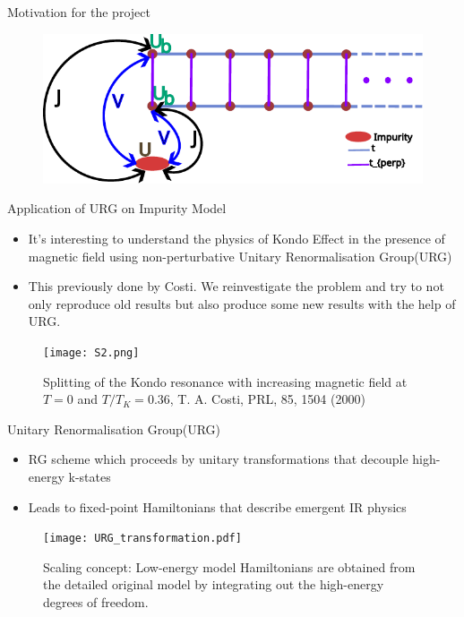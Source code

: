 \documentclass{beamer}
\begin{document}
\begin{frame}{Motivation for the project}
\begin{figure}[!ht]
    \centering
    \includegraphics[scale=0.6]{3-orbital-final-model.pdf}
\end{figure}
\end{frame}


\begin{frame}{Application of URG on Impurity Model}
\begin{itemize}
\item It's interesting to understand the physics of Kondo Effect in the presence of magnetic field using non-perturbative Unitary Renormalisation Group(URG) 
\item This previously done by Costi. We reinvestigate the problem and try to not only reproduce old results but also produce some new results with the help of URG.
\end{itemize}
\begin{figure}[!ht]
    \centering
    \texttt{[image: S2.png]}
    \caption{{\small Splitting of the Kondo resonance with increasing magnetic field at $T=0$ and $T/T_K = 0.36$, {\small \textcolor{mLightGreen}{T. A. Costi, PRL, 85, 1504 (2000)}}}}
\end{figure}
\end{frame}

\begin{frame}{Unitary Renormalisation Group(URG)}
\begin{itemize}
\item RG scheme which proceeds by unitary transformations that decouple high-energy k-states
\item Leads to fixed-point Hamiltonians that describe emergent IR physics
\end{itemize}
\begin{figure}[!ht]
    \centering
    \texttt{[image: URG\_transformation.pdf]}
    \caption{Scaling concept: Low-energy model Hamiltonians are obtained from the detailed original model by integrating out the high-energy degrees of freedom.}
\end{figure}

\end{frame}
\end{document}
